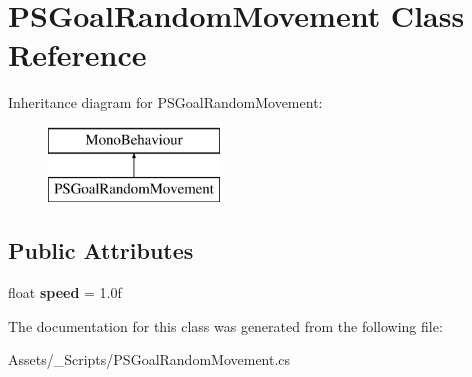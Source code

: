 \hypertarget{class_p_s_goal_random_movement}{}\section{P\+S\+Goal\+Random\+Movement Class Reference}
\label{class_p_s_goal_random_movement}
Inheritance diagram for P\+S\+Goal\+Random\+Movement\+:\begin{figure}[H]
\begin{center}
\leavevmode
\includegraphics[height=2.000000cm]{class_p_s_goal_random_movement}
\end{center}
\end{figure}
\subsection*{Public Attributes}
\begin{DoxyCompactItemize}
\item 
\mbox{\label{class_p_s_goal_random_movement_a15403bed0dac463716ea40bbc9d2db14}} 
float {\bfseries speed} = 1.\+0f
\end{DoxyCompactItemize}


The documentation for this class was generated from the following file\+:\begin{DoxyCompactItemize}
\item 
Assets/\+\_\+\+Scripts/P\+S\+Goal\+Random\+Movement.\+cs\end{DoxyCompactItemize}
